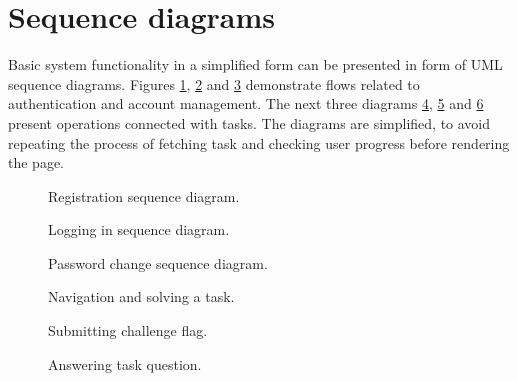 \section{Sequence diagrams}

Basic system functionality in a simplified form can be presented in form of UML sequence diagrams. Figures \ref{fig:seq-register}, \ref{fig:seq-login} and \ref{fig:seq-change-pass} demonstrate flows related to authentication and account management. The next three diagrams \ref{fig:seq-task}, \ref{fig:seq-task-flag} and \ref{fig:seq-task-answer} present operations connected with tasks. The diagrams are simplified, to avoid repeating the process of fetching task and checking user progress before rendering the page.


\begin{figure}
    \centering
    
    \caption{Registration sequence diagram.}
    \label{fig:seq-register}
\end{figure}

\begin{figure}
    \centering
    
    \caption{Logging in sequence diagram.}
    \label{fig:seq-login}
\end{figure}

\begin{figure}
    \centering
    
    \caption{Password change sequence diagram.}
    \label{fig:seq-change-pass}
\end{figure}

\begin{figure}
    \centering
    
    \caption{Navigation and solving a task.}
    \label{fig:seq-task}
\end{figure}

\begin{figure}
    \centering
    
    \caption{Submitting challenge flag.}
    \label{fig:seq-task-flag}
\end{figure}

\begin{figure}
    \fontsize{10}{12}\selectfont
    \centering
    
    \caption{Answering task question.}
    \label{fig:seq-task-answer}
\end{figure}

